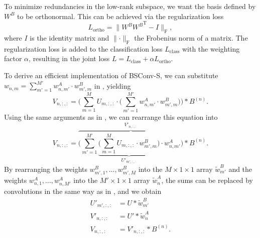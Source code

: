 \documentclass[10pt,twocolumn,letterpaper]{article}
\newcommand{\DCCK}{BSConv\xspace}
\newcommand{\DCCKS}{\DCCK-S\xspace}
\newcommand{\tensorIn}{U}
\newcommand{\tensorOut}{V}
\newcommand{\blueprint}[1]{B^{(#1)}}
\newcommand{\weight}{w}
\newcommand{\weightA}{w^A}
\newcommand{\weightAArray}{\tilde{w}^A}
\newcommand{\weightB}{w^B}
\newcommand{\weightBArray}{\tilde{w}^B}
\newcommand{\weightMatrixB}{W^B}
\newcommand{\channelInCount}{M}
\newcommand{\channelInIndex}{m}
\newcommand{\channelOutIndex}{n}
\begin{document}
To minimize redundancies in the low-rank subspace, we want the basis defined by $\weightMatrixB$ to be orthonormal.
This can be achieved via the regularization loss
\begin{equation}
	L_{\text{ortho}} = \big\lVert \weightMatrixB {\weightMatrixB}^{\text{T}} - I \big\rVert_{\text{F}},
\end{equation}
where $I$ is the identity matrix and $\lVert \cdot \rVert_{\text{F}}$ the Frobenius norm of a matrix.
The regularization loss is added to the classification loss $L_{\text{class}}$ with the weighting factor $\alpha$, resulting in the joint loss $L = L_{\text{class}} + \alpha L_{\text{ortho}}$.

To derive an efficient implementation of \DCCKS, we can substitute $\weight_{\channelOutIndex, \channelInIndex} = \sum_{\channelInIndex' = 1}^{\channelInCount'} \weightA_{\channelOutIndex, \channelInIndex'} \cdot \weightB_{\channelInIndex', \channelInIndex} $ in , yielding
\begin{equation}
	\tensorOut_{\channelOutIndex, :, :} = \Bigg( \sum_{\channelInIndex = 1}^{\channelInCount} \tensorIn_{\channelInIndex, :, :} \cdot \Big( \sum_{\channelInIndex' = 1}^{\channelInCount'} \weightA_{\channelOutIndex, \channelInIndex'} \cdot \weightB_{\channelInIndex', \channelInIndex} \Big) \Bigg) * \blueprint{\channelOutIndex}.
\end{equation}
Using the same arguments as in , we can rearrange this equation into
\begin{equation}
	\tensorOut_{\channelOutIndex, :, :} = \overbrace{ \Bigg( \sum_{\channelInIndex' = 1}^{\channelInCount'} \underbrace{ \Big( \sum_{\channelInIndex = 1}^{\channelInCount} \tensorIn_{\channelInIndex, :, :} \cdot \weightB_{\channelInIndex', \channelInIndex} \Big) }_{\tensorIn'_{\channelInIndex', :, :}} \cdot \weightA_{\channelOutIndex, \channelInIndex'} \Bigg) }^{\tensorOut'_{\channelOutIndex, :, :}} * \blueprint{\channelOutIndex}.
\end{equation}
By rearranging the weights $\weightB_{\channelInIndex', 1}, \dots, \weightB_{\channelInIndex', \channelInCount}$ into the $\channelInCount \times 1 \times 1$ array $\weightBArray_{\channelInIndex'}$ and the weights $\weightA_{\channelOutIndex, 1}, \dots, \weightA_{\channelOutIndex, \channelInCount'}$ into the $\channelInCount' \times 1 \times 1$ array $\weightAArray_{\channelOutIndex}$, the sums can be replaced by convolutions in the same way as in , and we obtain
\begin{align}
	\tensorIn'_{\channelInIndex', :, :}  & = \tensorIn * \weightBArray_{\channelInIndex'} \label{eq:dcckV2Pointwise1} \\
	\tensorOut'_{\channelOutIndex, :, :} & = \tensorIn' * \weightAArray_{\channelOutIndex} \label{eq:dcckV2Pointwise2} \\
	\tensorOut_{\channelOutIndex, :, :}  & = \tensorOut'_{\channelOutIndex, :, :} * \blueprint{\channelOutIndex}. \label{eq:dcckV2Depthwise}
\end{align}
\end{document}
